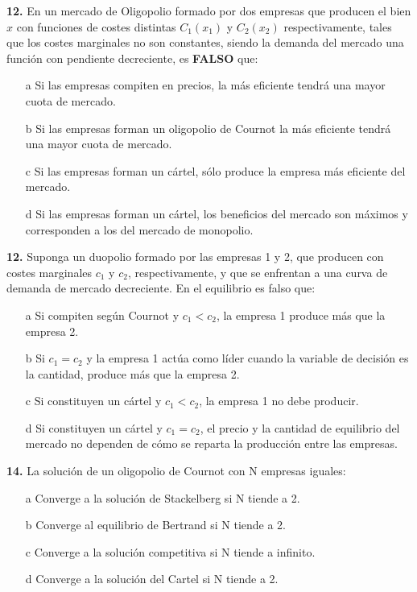 \documentclass{nuevotema}
\begin{document}


\textbf{12.} En un mercado de Oligopolio formado por dos empresas que producen el bien $x$ con funciones de costes distintas $C_1(x_1)$ y $C_2(x_2)$ respectivamente, tales que los costes marginales no son constantes, siendo la demanda del mercado una función con pendiente decreciente, es \textbf{FALSO} que:
\begin{enumerate}
	\item[a] Si las empresas compiten en precios, la más eficiente tendrá una mayor cuota de mercado.
	\item[b] Si las empresas forman un oligopolio de Cournot la más eficiente tendrá una mayor cuota de mercado.
	\item[c] Si las empresas forman un cártel, sólo produce la empresa más eficiente del mercado.
	\item[d] Si las empresas forman un cártel, los beneficios del mercado son máximos y corresponden a los del mercado de monopolio.
\end{enumerate}


\textbf{12.} Suponga un duopolio formado por las empresas 1 y 2, que producen con costes marginales $c_1$ y $c_2$, respectivamente, y que se enfrentan a una curva de demanda de mercado decreciente. En el equilibrio es falso que:

\begin{enumerate}
	\item[a] Si compiten según Cournot y $c_1 < c_2$, la empresa 1 produce más que la empresa 2.
	\item[b] Si $c_1 = c_2$ y la empresa 1 actúa como líder cuando la variable de decisión es la cantidad, produce más que la empresa 2.
	\item[c] Si constituyen un cártel y $c_1 < c_2$, la empresa 1 no debe producir.
	\item[d] Si constituyen un cártel y $c_1 = c_2$, el precio y la cantidad de equilibrio del mercado no dependen de cómo se reparta la producción entre las empresas.
\end{enumerate}

\textbf{14.} La solución de un oligopolio de Cournot con N empresas iguales:
\begin{enumerate}
	\item[a] Converge a la solución de Stackelberg si N tiende a 2.
	\item[b] Converge al equilibrio de Bertrand si N tiende a 2.
	\item[c] Converge a la solución competitiva si N tiende a infinito.
	\item[d] Converge a la solución del Cartel si N tiende a 2.
\end{enumerate}
\end{document}

